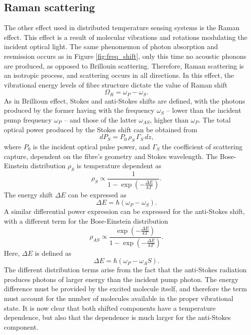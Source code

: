 \documentclass{standalone}
\begin{document}
\subsection{Raman scattering}
The other effect used in distributed temperature sensing systems is the Raman effect. This effect is a result of molecular vibrations and rotations modulating the incident optical light. The same phenomemon of photon absorption and reemission occurs as in Figure \ref{fig:freq_shift}, only this time no acoustic phonons are produced, as opposed to Brillouin scattering. Therefore, Raman scattering is an isotropic process, and scattering occurs in all directions. In this effect, the vibrational energy levels of fibre structure dictate the value of Raman shift
\begin{equation}
\Omega_R = \omega_P - \omega_S \textrm{.}
\end{equation}
As in Brillioun effect, Stokes and anti-Stokes shifts are defined, with the photons produced by the former having with the frequency $\omega_S$ -- lower than the incident pump frequency $\omega_P$ -- and those of the latter $\omega_{AS}$, higher than $\omega_P$. The total optical power produced by the Stokes shift can be obtained from 
\begin{equation} \label{eq:raman_beer}
dP_S = P_0 \, \rho_S \, \Gamma_S \, dz \textrm{,}
\end{equation}
where $P_0$ is the incident optical pulse power, and $\Gamma_S$ the coefficient of scattering capture, dependent on the fibre's geometry and Stokes wavelength. The Bose-Einstein distribution $\rho_S$ is temperature dependent as
\begin{equation} \label{eq:be-s}
\rho_S \propto \frac{1}{1- \exp\left( - \frac{\varDelta E}{k T} \right)} \textrm{.}
\end{equation}
The energy shift $\varDelta E$ can be expressed as
\begin{equation}
\varDelta E = \hbar \left( \omega_P - \omega_S \right) \textrm{.}
\end{equation}
A similar differential power expression can be expressed for the anti-Stokes shift, with a different term for the Bose-Einstein distribution
\begin{equation} \label{eq:be-as}
\rho_{AS} \propto \frac{\exp\left( - \frac{\varDelta E}{k T} \right)}{1 - \exp\left( - \frac{\varDelta E}{k T} \right)} \textrm{.}
\end{equation}
Here, $\varDelta E$ is defined as
\begin{equation}
\varDelta E = \hbar \left( \omega_P - \omega_AS \right) \textrm{.}
\end{equation}
The different distribution terms arise from the fact that the anti-Stokes radiation produces photons of larger energy than the incident pump photon. The energy difference must be provided by the excited molecule itself, and therefore the term must account for the number of molecules available in the proper vibrational state. It is now clear that both shifted components have a temperature dependence, but also that the dependence is much larger for the anti-Stokes component. \\
\end{document}
